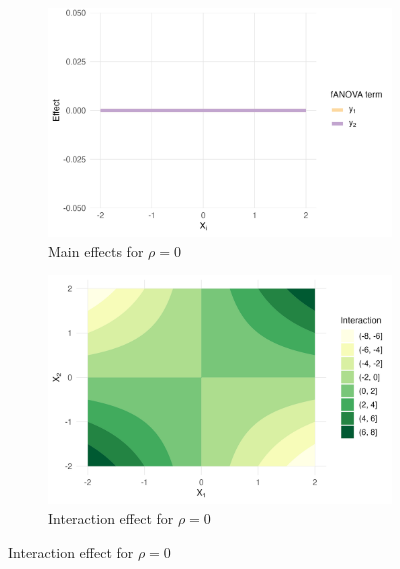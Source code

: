 \begin{figure}[htpb]
    \vspace{0.5em}
    \begin{subfigure}[t]{0.49\textwidth}
        \centering
        \includegraphics[width=\textwidth]{images/experiment_section/interaction_a1p00_a2p00_a11p00_a22p00_a12p20_rhop00_main.png}
        \caption{Main effects for $\rho = 0$}
    \end{subfigure}%
    \hfill
    \begin{subfigure}[t]{0.49\textwidth}
        \centering
        \includegraphics[width=\textwidth]{images/experiment_section/interaction_a1p00_a2p00_a11p00_a22p00_a12p20_rhop00_interaction.png}
        \caption{Interaction effect for $\rho = 0$}
    \end{subfigure}


\end{figure}
